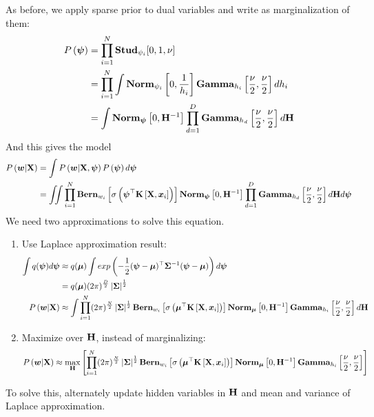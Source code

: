 As before, we apply sparse prior to dual variables and write as marginalization of them:
\begin{align*}
	P\left(\boldsymbol{\psi}\right)&=\prod_{i=1}^N\mathbf{Stud}_{\psi_i}[0,1,\nu] \\
	&=\prod_{i=1}^N\int\mathbf{Norm}_{\psi_i}\left[0,\frac{1}{h_i}\right]\mathbf{Gamma}_{h_i}\left[\frac{\nu}{2},\frac{\nu}{2}\right]dh_i \\
	&=\int\mathbf{Norm}_{\boldsymbol{\psi}}\left[0,\mathbf{H}^{-1}\right]\prod_{d=1}^D\mathbf{Gamma}_{h_d}\left[\frac{\nu}{2},\frac{\nu}{2}\right]d\mathbf{H}
\end{align*}
And this gives the model
\begin{align*}
	P\left(\boldsymbol{w}|\mathbf{X}\right)&=\int P\left(\boldsymbol{w}|\mathbf{X},\boldsymbol{\psi}\right)P\left(\boldsymbol{\psi}\right)d\boldsymbol{\psi} \\
	&=\iint\prod_{i=1}^N\mathbf{Bern}_{w_i}\left[\sigma\left(\boldsymbol{\psi}^\top\mathbf{K}\left[\mathbf{X},\boldsymbol{x}_i\right]\right)\right]\mathbf{Norm}_{\boldsymbol{\psi}}\left[0,\mathbf{H}^{-1}\right]\prod_{d=1}^D\mathbf{Gamma}_{h_d}\left[\frac{\nu}{2},\frac{\nu}{2}\right]d\mathbf{H}d\boldsymbol{\psi}
\end{align*}
We need two approximations to solve this equation.
\begin{enumerate}
	\item Use Laplace approximation result:
	\begin{align*}
		\int q(\boldsymbol{\psi})d\boldsymbol{\psi}&\approx q(\boldsymbol{\mu})\int exp\left(-\frac{1}{2}(\boldsymbol{\psi}-\boldsymbol{\mu})^\top\mathbf{\Sigma}^{-1}(\boldsymbol{\psi}-\boldsymbol{\mu})\right)d\boldsymbol{\psi} \\
		&=q(\boldsymbol{\mu})(2\pi)^{\frac{D}{2}}\left\vert \mathbf{\Sigma} \right\vert^{\frac{1}{2}} \\
		P\left(\boldsymbol{w}|\mathbf{X}\right)&\approx\int\prod_{i=1}^N(2\pi)^{\frac{N}{2}}\left\vert \mathbf{\Sigma} \right\vert^{\frac{1}{2}}\mathbf{Bern}_{w_i}\left[\sigma\left(\boldsymbol{\mu}^\top\mathbf{K}\left[\mathbf{X},\boldsymbol{x}_i\right]\right)\right]\mathbf{Norm}_{\boldsymbol{\mu}}\left[0,\mathbf{H}^{-1}\right]\mathbf{Gamma}_{h_i}\left[\frac{\nu}{2},\frac{\nu}{2}\right]d\mathbf{H}
	\end{align*}
	\item Maximize over $\mathbf{H}$, instead of marginalizing:
	\begin{align*}
		P\left(\boldsymbol{w}|\mathbf{X}\right)\approx\max_{\mathbf{H}}\left[\prod_{i=1}^N(2\pi)^{\frac{N}{2}}\left\vert \mathbf{\Sigma} \right\vert^{\frac{1}{2}}\mathbf{Bern}_{w_i}\left[\sigma\left(\boldsymbol{\mu}^\top\mathbf{K}\left[\mathbf{X},\boldsymbol{x}_i\right]\right)\right]\mathbf{Norm}_{\boldsymbol{\mu}}\left[0,\mathbf{H}^{-1}\right]\mathbf{Gamma}_{h_i}\left[\frac{\nu}{2},\frac{\nu}{2}\right]\right]
	\end{align*}
\end{enumerate}
To solve this, alternately update hidden variables in $\mathbf{H}$ and mean and variance of Laplace approximation.



